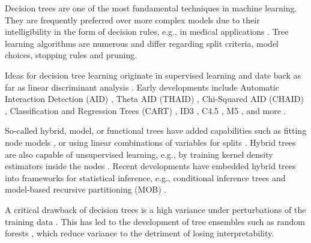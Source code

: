 \documentclass[a4paper, 11pt]{article}
\begin{document}
Decision trees are one of the most fundamental techniques in machine learning. They are frequently preferred over more complex models due to their intelligibility in the form of decision rules, e.g., in medical applications \cite{podgorelec_trees_medicine}. Tree learning algorithms are numerous and differ regarding split criteria, model choices, stopping rules and pruning. \par
Ideas for decision tree learning originate in supervised learning and date back as far as linear discriminant analysis \cite{fisher_lda}. Early developments include Automatic Interaction Detection (AID) \cite{hawkins_AID}, Theta AID (THAID) \cite{ messenger_mandell_thaid}, Chi-Squared AID (CHAID) \cite{kass_chaid}, Classification and Regression Trees (CART) \cite{cart_1, hastie_elemstatlearn}, ID3 \cite{quinlan_induction}, C4.5 \cite{quinlan_c45}, M5 \cite{quinlan_m5}, and more \cite{loh_trees_review}.
\par
So-called hybrid, model, or functional trees \cite{zeileis_mob} have added capabilities such as fitting node models \cite{quinlan_model_tree}, or using linear combinations of variables for splits \cite{brodley_multivariate_trees}. Hybrid trees are also capable of unsupervised learning, e.g., by training kernel density estimators inside the nodes \cite{ram_density_estimation_tree}.
Recent developments have embedded hybrid trees into frameworks for  statistical inference, e.g., conditional inference trees \cite{hothorn_ctree} and model-based recursive partitioning (MOB) \cite{zeileis_mob}.
\par
A critical drawback of decision trees is a high variance under perturbations of the training data \cite{hastie_elemstatlearn}. This has led to the development of tree ensembles such as random forests \cite{breiman_randomforests}, which reduce variance to the detriment of losing interpretability.

\par
\end{document}
